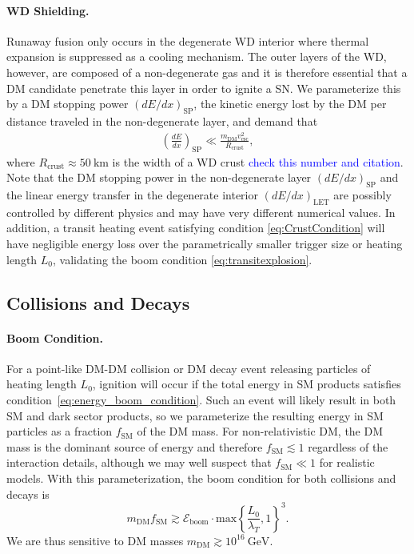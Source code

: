 \documentclass[twocolumn, preprintnumbers,amsmath,amssymb,prd, superscriptaddress]{revtex4}
\newcommand{\Eboom}{\mathcal{E}_\text{boom}}
\newcommand{\GeV}{\text{GeV}}
\begin{document}
\paragraph{WD Shielding.}
Runaway fusion only occurs in the degenerate WD interior where thermal expansion is suppressed as a cooling mechanism.
The outer layers of the WD, however, are composed of a non-degenerate gas and it is therefore essential that a DM candidate penetrate this layer in order to ignite a SN.
We parameterize this by a DM stopping power $(dE/dx)_\text{SP}$, the kinetic energy lost by the DM per distance traveled in the non-degenerate layer, and demand that
\begin{align}
\label{eq:CrustCondition}
  \left( \frac{d E}{d x} \right)_\text{SP} \ll
  \frac{m_\text{DM} v^2_\text{esc}}{R_\text{crust}},
\end{align}
where $R_\text{crust} \approx 50 ~\text{km}$ is the width of a WD crust \cite{Chandrasekhar} \textcolor{blue}{check this number and citation}.
Note that the DM stopping power in the non-degenerate layer $(dE/dx)_\text{SP}$ and the linear energy transfer in the degenerate interior $(dE/dx)_\text{LET}$ are possibly controlled by different physics and may have very different numerical values.
In addition, a transit heating event satisfying condition \eqref{eq:CrustCondition} will have negligible energy loss over the parametrically smaller trigger size or heating length $L_0$, validating the boom condition \eqref{eq:transitexplosion}.

\subsection{Collisions and Decays}

\paragraph{Boom Condition.}
For a point-like DM-DM collision or DM decay event releasing particles of heating length $L_0$, ignition will occur if the total energy in SM products satisfies condition~\eqref{eq:energy_boom_condition}.
Such an event will likely result in both SM and dark sector products, so we parameterize the resulting energy in SM particles as a fraction $f_\text{SM}$ of the DM mass.
For non-relativistic DM, the DM mass is the dominant source of energy and therefore $f_\text{SM} \lesssim 1$ regardless of the interaction details, although we may well suspect that $f_\text{SM} \ll 1$ for realistic models.
With this parameterization, the boom condition for both collisions and decays is
\begin{equation}
\label{eq:coldecay}
  m_\text{DM} f_\text{SM}  \gtrsim \Eboom \cdot \text{max} \left \{\frac{L_0}{\lambda_T}, 1 \right \}^3.
\end{equation}
We are thus sensitive to DM masses $m_\text{DM} \gtrsim 10^{16} ~\GeV$.
\end{document}

